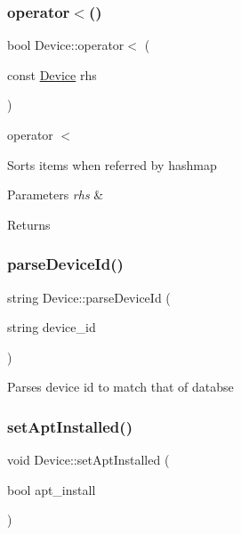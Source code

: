 \subsubsection{\texorpdfstring{operator$<$()}{operator<()}\hspace{0.1cm}{\footnotesize\ttfamily [2/2]}}
{\footnotesize\ttfamily bool Device\+::operator$<$ (\begin{DoxyParamCaption}\item[{const \hyperlink{classDevice}{Device}}]{rhs }\end{DoxyParamCaption})}



operator $<$ 

Sorts items when referred by hashmap 
\begin{DoxyParams}{Parameters}
{\em rhs} & \\
\hline
\end{DoxyParams}
\begin{DoxyReturn}{Returns}

\end{DoxyReturn}
\mbox{\label{classDevice_a0c77b871987e94ec9088e8ab78f27293}} 
\subsubsection{\texorpdfstring{parse\+Device\+Id()}{parseDeviceId()}}
{\footnotesize\ttfamily string Device\+::parse\+Device\+Id (\begin{DoxyParamCaption}\item[{string}]{device\+\_\+id }\end{DoxyParamCaption})}

Parses device id to match that of databse \mbox{\label{classDevice_a15d7c755aed944da8514902d06d21ea9}} 
\subsubsection{\texorpdfstring{set\+Apt\+Installed()}{setAptInstalled()}}
{\footnotesize\ttfamily void Device\+::set\+Apt\+Installed (\begin{DoxyParamCaption}\item[{bool}]{apt\+\_\+install }\end{DoxyParamCaption})}



